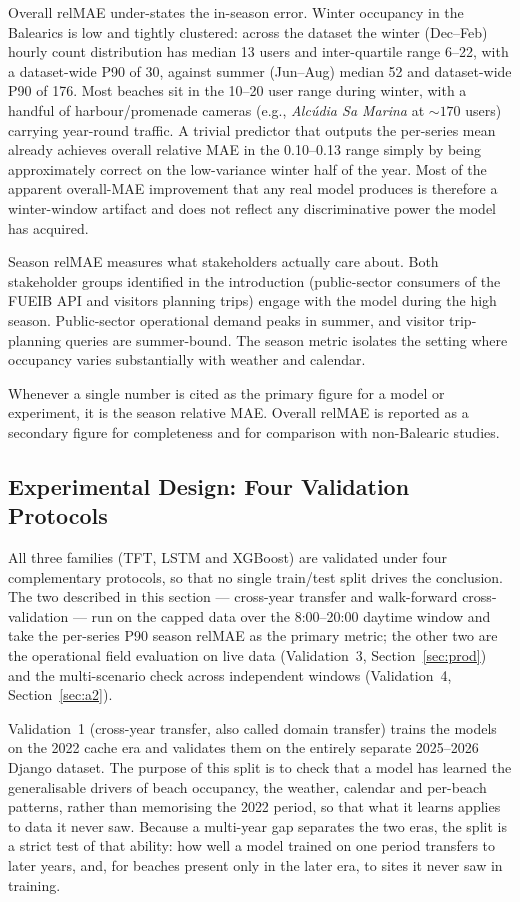 \documentclass[twocolumn,twoside,a4paper,10pt]{IEEEtran}
\begin{document}
Overall relMAE under-states the in-season error. Winter occupancy in the Balearics is low and tightly clustered: across the dataset the winter (Dec--Feb) hourly count distribution has median 13 users and inter-quartile range 6--22, with a dataset-wide P90 of 30, against summer (Jun--Aug) median 52 and dataset-wide P90 of 176. Most beaches sit in the 10--20 user range during winter, with a handful of harbour/promenade cameras (e.g., \emph{Alcúdia Sa Marina} at $\sim 170$ users) carrying year-round traffic. A trivial predictor that outputs the per-series mean already achieves overall relative MAE in the 0.10--0.13 range simply by being approximately correct on the low-variance winter half of the year. Most of the apparent overall-MAE improvement that any real model produces is therefore a winter-window artifact and does not reflect any discriminative power the model has acquired.

Season relMAE measures what stakeholders actually care about. Both stakeholder groups identified in the introduction (public-sector consumers of the FUEIB API and visitors planning trips) engage with the model during the high season. Public-sector operational demand peaks in summer, and visitor trip-planning queries are summer-bound. The season metric isolates the setting where occupancy varies substantially with weather and calendar.

Whenever a single number is cited as the primary figure for a model or experiment, it is the season relative MAE. Overall relMAE is reported as a secondary figure for completeness and for comparison with non-Balearic studies.

\subsection{Experimental Design: Four Validation Protocols}\label{sec:design}

All three families (TFT, LSTM and XGBoost) are validated under four complementary protocols, so that no single train/test split drives the conclusion. The two described in this section --- cross-year transfer and walk-forward cross-validation --- run on the capped data over the 8:00--20:00 daytime window and take the per-series P90 season relMAE as the primary metric; the other two are the operational field evaluation on live data (Validation~3, Section~\ref{sec:prod}) and the multi-scenario check across independent windows (Validation~4, Section~\ref{sec:a2}).

Validation~1 (cross-year transfer, also called domain transfer) trains the models on the 2022 cache era and validates them on the entirely separate 2025--2026 Django dataset. The purpose of this split is to check that a model has learned the generalisable drivers of beach occupancy, the weather, calendar and per-beach patterns, rather than memorising the 2022 period, so that what it learns applies to data it never saw. Because a multi-year gap separates the two eras, the split is a strict test of that ability: how well a model trained on one period transfers to later years, and, for beaches present only in the later era, to sites it never saw in training.
\end{document}
